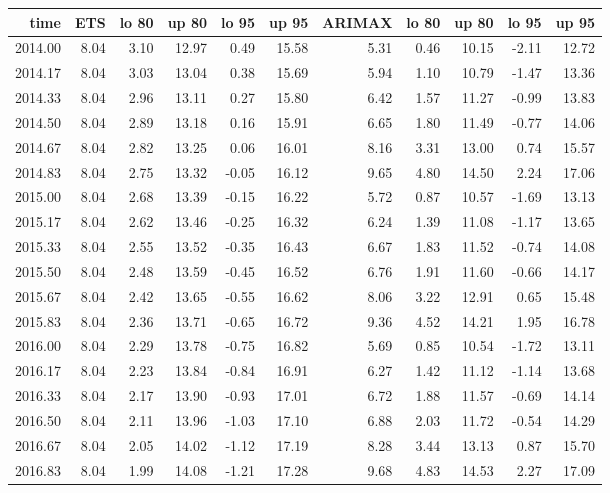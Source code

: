 \documentclass[10pt,a4paper]{article}\usepackage[]{graphicx}\usepackage[]{color}
\begin{document}
\begin{table}[ht]
\centering
\begin{tabular}{rrrrrrrrrrr}
  \hline
time & ETS  & lo 80 & up 80 & lo 95 & up 95 & ARIMAX  & lo 80 & up 80 & lo 95 & up 95 \\ 
  \hline
2014.00 & 8.04 & 3.10 & 12.97 & 0.49 & 15.58 & 5.31 & 0.46 & 10.15 & -2.11 & 12.72 \\ 
  2014.17 & 8.04 & 3.03 & 13.04 & 0.38 & 15.69 & 5.94 & 1.10 & 10.79 & -1.47 & 13.36 \\ 
  2014.33 & 8.04 & 2.96 & 13.11 & 0.27 & 15.80 & 6.42 & 1.57 & 11.27 & -0.99 & 13.83 \\ 
  2014.50 & 8.04 & 2.89 & 13.18 & 0.16 & 15.91 & 6.65 & 1.80 & 11.49 & -0.77 & 14.06 \\ 
  2014.67 & 8.04 & 2.82 & 13.25 & 0.06 & 16.01 & 8.16 & 3.31 & 13.00 & 0.74 & 15.57 \\ 
  2014.83 & 8.04 & 2.75 & 13.32 & -0.05 & 16.12 & 9.65 & 4.80 & 14.50 & 2.24 & 17.06 \\ 
  2015.00 & 8.04 & 2.68 & 13.39 & -0.15 & 16.22 & 5.72 & 0.87 & 10.57 & -1.69 & 13.13 \\ 
  2015.17 & 8.04 & 2.62 & 13.46 & -0.25 & 16.32 & 6.24 & 1.39 & 11.08 & -1.17 & 13.65 \\ 
  2015.33 & 8.04 & 2.55 & 13.52 & -0.35 & 16.43 & 6.67 & 1.83 & 11.52 & -0.74 & 14.08 \\ 
  2015.50 & 8.04 & 2.48 & 13.59 & -0.45 & 16.52 & 6.76 & 1.91 & 11.60 & -0.66 & 14.17 \\ 
  2015.67 & 8.04 & 2.42 & 13.65 & -0.55 & 16.62 & 8.06 & 3.22 & 12.91 & 0.65 & 15.48 \\ 
  2015.83 & 8.04 & 2.36 & 13.71 & -0.65 & 16.72 & 9.36 & 4.52 & 14.21 & 1.95 & 16.78 \\ 
  2016.00 & 8.04 & 2.29 & 13.78 & -0.75 & 16.82 & 5.69 & 0.85 & 10.54 & -1.72 & 13.11 \\ 
  2016.17 & 8.04 & 2.23 & 13.84 & -0.84 & 16.91 & 6.27 & 1.42 & 11.12 & -1.14 & 13.68 \\ 
  2016.33 & 8.04 & 2.17 & 13.90 & -0.93 & 17.01 & 6.72 & 1.88 & 11.57 & -0.69 & 14.14 \\ 
  2016.50 & 8.04 & 2.11 & 13.96 & -1.03 & 17.10 & 6.88 & 2.03 & 11.72 & -0.54 & 14.29 \\ 
  2016.67 & 8.04 & 2.05 & 14.02 & -1.12 & 17.19 & 8.28 & 3.44 & 13.13 & 0.87 & 15.70 \\ 
  2016.83 & 8.04 & 1.99 & 14.08 & -1.21 & 17.28 & 9.68 & 4.83 & 14.53 & 2.27 & 17.09 \\ 

\end{tabular}
\end{table}
\end{document}
